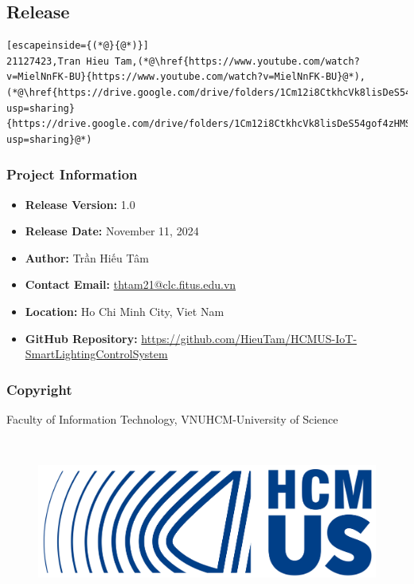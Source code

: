\subsection{Release}
\begin{lstlisting}[escapeinside={(*@}{@*)}]
21127423,Tran Hieu Tam,(*@\href{https://www.youtube.com/watch?v=MielNnFK-BU}{https://www.youtube.com/watch?v=MielNnFK-BU}@*),(*@\href{https://drive.google.com/drive/folders/1Cm12i8CtkhcVk8lisDeS54gof4zHMSak?usp=sharing}{https://drive.google.com/drive/folders/1Cm12i8CtkhcVk8lisDeS54gof4zHMSak?usp=sharing}@*)
\end{lstlisting}









\vspace{1cm}
{\small
\subsubsection*{Project Information}

\begin{itemize}
    \item \textbf{Release Version:} 1.0
    \item \textbf{Release Date:} November 11, 2024
    \item \textbf{Author:} Trần Hiếu Tâm
    \item \textbf{Contact Email:} \href{mailto:thtam21@clc.fitus.edu.vn}{thtam21@clc.fitus.edu.vn}
    \item \textbf{Location:} Ho Chi Minh City, Viet Nam
    \item \textbf{GitHub Repository:} \href{https://github.com/HieuTam/HCMUS-IoT-SmartLightingControlSystem}{https://github.com/HieuTam/HCMUS-IoT-SmartLightingControlSystem}\\[1cm]
\end{itemize}

\subsubsection*{Copyright}
\noindent Faculty of Information Technology, VNUHCM-University of Science
}\\[1.5cm]

\begin{figure}[H]
    \centering
    \includegraphics[width=0.35\linewidth]{img/Logo-HCMUS-Symbol.png}
\end{figure}